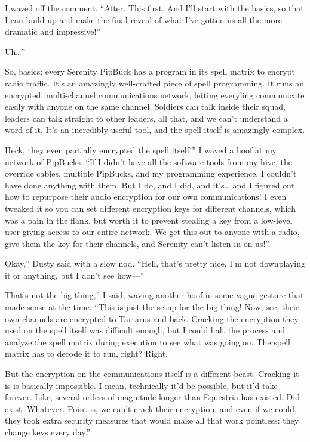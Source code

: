 I waved off the comment. “After. This first. And I’ll start with the basics, so that I can build up and make the final reveal of what I’ve gotten us all the more dramatic and impressive!”

\leavevmode{}Uh…”

\leavevmode{}So, basics: every Serenity PipBuck has a program in its spell matrix to encrypt radio traffic. It’s an amazingly well-crafted piece of spell programming. It runs an encrypted, multi-channel communications network, letting everyling communicate easily with anyone on the same channel. Soldiers can talk inside their squad, leaders can talk straight to other leaders, all that, and we can’t understand a word of it. It’s an incredibly useful tool, and the spell itself is amazingly complex.

\leavevmode{}Heck, they even partially encrypted the spell itself!” I waved a hoof at my network of PipBucks. “If I didn’t have all the software tools from my hive, the override cables, multiple PipBucks, and my programming experience, I couldn’t have done anything with them. But I do, and I did, and it's… and I figured out how to repurpose their audio encryption for our own communications! I even tweaked it so you can set different encryption keys for different channels, which was a pain in the flank, but worth it to prevent stealing a key from a low-level user giving access to our entire network. We get this out to anyone with a radio, give them the key for their channels, and Serenity can’t listen in on us!”

\leavevmode{}Okay,” Dusty said with a slow nod. “Hell, that’s pretty nice. I’m not downplaying it or anything, but I don’t see how—”

\leavevmode{}That’s not the big thing,” I said, waving another hoof in some vague gesture that made sense at the time. “This is just the setup for the big thing! Now, see, their own channels are encrypted to Tartarus and back. Cracking the encryption they used on the spell itself was difficult enough, but I could halt the process and analyze the spell matrix during execution to see what was going on. The spell matrix has to decode it to run, right? Right.

\leavevmode{}But the encryption on the communications itself is a different beast. Cracking it is is basically impossible. I mean, technically it’d be possible, but it’d take forever. Like, several orders of magnitude longer than Equestria has existed. Did exist. Whatever. Point is, we can’t crack their encryption, and even if we could, they took extra security measures that would make all that work pointless: they change keys every day.”

